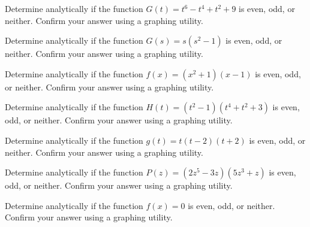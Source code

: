 \documentclass{ximera}
\begin{document}
\begin{problem}
Determine analytically if the function $G(t) = t^{6} - t^{4} + t^{2} + 9$ is even, odd, or neither.  Confirm your answer using a graphing utility.  

\end{problem} 
 
\begin{problem}
Determine analytically if the function $G(s) = s(s^2 - 1)$ is even, odd, or neither.  Confirm your answer using a graphing utility.  
\end{problem} 

\begin{problem}
Determine analytically if the function $f(x) = (x^2+1)(x-1)$ is even, odd, or neither.  Confirm your answer using a graphing utility.  

\end{problem}

\begin{problem}
Determine analytically if the function $H(t) = (t^2-1)(t^4+t^2+3)$ is even, odd, or neither.  Confirm your answer using a graphing utility.  
\end{problem}

\begin{problem}
Determine analytically if the function $g(t) = t(t-2)(t+2)$ is even, odd, or neither.  Confirm your answer using a graphing utility. 

\end{problem}

\begin{problem}
Determine analytically if the function $P(z) = (2z^{5} - 3z)(5z^3+z)$ is even, odd, or neither.  Confirm your answer using a graphing utility.  
\end{problem}
 
\begin{problem}\label{evenoddornotpolylast}
Determine analytically if the function $f(x) =0$ is even, odd, or neither.  Confirm your answer using a graphing utility.  

\end{problem}
\end{document}
